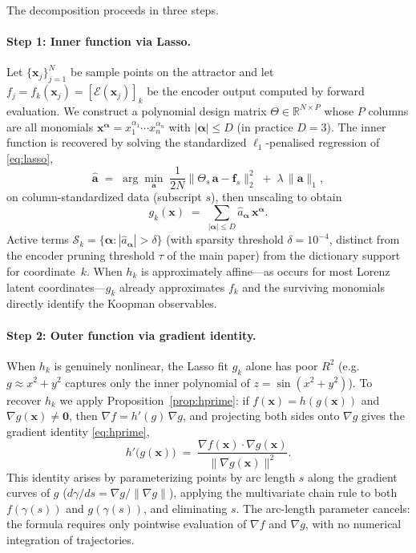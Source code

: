 \documentclass{article}
\newcommand{\R}{\mathbb{R}}
\newcommand{\x}{\bm{x}}
\begin{document}
The decomposition proceeds in three steps.

\paragraph{Step 1: Inner function via Lasso.}
Let $\{\x_j\}_{j=1}^N$ be sample points on the attractor and let
$f_j = f_k(\x_j) = [\mathcal{E}(\x_j)]_k$ be the encoder output computed by
forward evaluation. We construct a polynomial design matrix
$\Theta\in\R^{N\times P}$ whose $P$ columns are all monomials
$\x^{\boldsymbol{\alpha}} = x_1^{\alpha_1}\cdots x_n^{\alpha_n}$ with
$|\boldsymbol{\alpha}|\le D$ (in practice $D = 3$). The inner function is
recovered by solving the standardized $\ell_1$-penalised regression of
\eqref{eq:lasso},
\begin{equation*}
  \hat{\bm{a}} \;=\; \arg\min_{\bm{a}}\;
    \frac{1}{2N}\bigl\|\Theta_s\,\bm{a} - \mathbf{f}_s\bigr\|_2^2
    \;+\; \lambda\,\|\bm{a}\|_1,
\end{equation*}
on column-standardized data (subscript $s$), then unscaling to obtain
\begin{equation*}
    g_k(\x)
    \;=\; \sum_{|\boldsymbol{\alpha}|\le D}
      \hat a_{\boldsymbol{\alpha}}\,\x^{\boldsymbol{\alpha}}.
\end{equation*}
Active terms
$\mathcal{S}_k = \{\boldsymbol{\alpha}:|\hat a_{\boldsymbol{\alpha}}|>\delta\}$
(with sparsity threshold $\delta = 10^{-4}$, distinct from the encoder
pruning threshold $\tau$ of the main paper) from the dictionary support for
coordinate~$k$. When $h_k$ is approximately affine---as occurs for most
Lorenz latent coordinates---$g_k$ already approximates $f_k$ and the surviving monomials directly identify the Koopman observables.

\paragraph{Step 2: Outer function via gradient identity.}
When $h_k$ is genuinely nonlinear, the Lasso fit $g_k$ alone has poor $R^2$
(e.g.\ $g\approx x^2+y^2$ captures only the inner polynomial of
$z = \sin(x^2+y^2)$). To recover $h_k$ we apply Proposition~\ref{prop:hprime}:
if $f(\x) = h(g(\x))$ and $\nabla g(\x)\ne\bm{0}$, then
$\nabla f = h'(g)\,\nabla g$, and projecting both sides onto $\nabla g$ gives
the gradient identity \eqref{eq:hprime},
\begin{equation*}
    h'\!\bigl(g(\x)\bigr)
    \;=\; \frac{\nabla f(\x)\cdot\nabla g(\x)}
              {\|\nabla g(\x)\|^2}.
\end{equation*}
This identity arises by parameterizing points by arc length $s$ along the
gradient curves of $g$ ($d\gamma/ds = \nabla g / \|\nabla g\|$), applying the
multivariate chain rule to both $f(\gamma(s))$ and $g(\gamma(s))$, and
eliminating $s$. The arc-length parameter cancels: the formula requires only
pointwise evaluation of $\nabla f$ and $\nabla g$, with no numerical
integration of trajectories.
\end{document}
